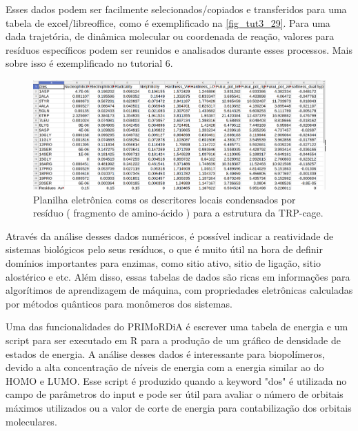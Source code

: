 \documentclass[a4paper,11pt]{refart}
\begin{document}
Esses dados podem ser facilmente selecionados/copiados e transferidos para uma tabela de excel/libreoffice, como é exemplificado na \autoref{fig_tut3_29}. Para uma dada trajetória, de dinâmica molecular ou coordenada de reação, valores para resíduos específicos podem ser reunidos e analisados durante esses processos. Mais sobre isso é exemplificado no tutorial 6.

\hspace*{-\leftmarginwidth}
\begin{minipage}{\fullwidth}
	\begin{figure}[H]
		\begin{center}
			\includegraphics[width=5in]{images/tut3_img30}
			\caption{Planilha eletrônica coms os descritores locais condensados por resíduo ( fragmento de amino-ácido ) para a estrutura da TRP-cage.}
			\label{fig_tut3_29}
		\end{center}
	\end{figure}
\end{minipage}

Através da análise desses dados numéricos, é possível indicar a reatividade de sistemas biológicos pelo seus resíduos, o que é muito útil na hora de definir domínios importantes para enzimas, como sitio ativo, sitio de ligação, sitio alostérico e etc. Além disso, essas tabelas de dados são ricas em informações para algorítimos de aprendizagem de máquina, com propriedades eletrônicas calculadas por métodos quânticos para monômeros dos sistemas. 

Uma das funcionalidades do PRIMoRDiA é escrever uma tabela de energia e um script para ser executado em R para a produção de um gráfico de densidade de estados de energia. A análise desses dados é interessante para biopolímeros, devido a alta concentração de níveis de energia com a energia similar ao do HOMO e LUMO. Esse script é produzido quando a keyword "dos" é utilizada no campo de parâmetros do input e pode ser útil para avaliar o número de orbitais máximos utilizados ou a valor de corte de energia para contabilização dos orbitais moleculares.
\end{document}
